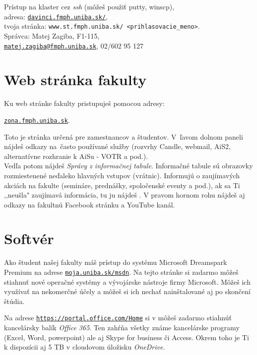 \medskip\noindent
Prístup na klaster cez \emph{ssh} (môžeš použiť putty, winscp),\\
adresa: \href{http://davinci.fmph.uniba.sk/}{\texttt{davinci.fmph.uniba.sk/}},\\
tvoja stránka: \texttt{www.st.fmph.uniba.sk/~<prihlasovacie\_meno>}.\\
Správca: Matej Zagiba, F1-115,\\
\href{mailto:matej.zagiba@fmph.uniba.sk}{\texttt{matej.zagiba@fmph.uniba.sk}}, 02/602 95 127

\section{Web stránka fakulty}

Ku web stránke fakulty pristupuješ pomocou adresy:

\begin{center}
	\vspace{-0.12cm}
\href{https://zona.fmph.uniba.sk}{\texttt{zona.fmph.uniba.sk}}.
	\vspace{-0.12cm}
\end{center}

\noindent
Toto je stránka určená pre zamestnancov a študentov. V~ľavom dolnom paneli nájdeš odkazy na~často používané služby (rozvrhy Candle, webmail, AiS2, alternatívne rozhranie k AiSu - VOTR a pod.). \\

Vedľa potom nájdeš \emph{Správy z informačnej tabule}. Informačné tabule sú obrazovky rozmiestenené neďaleko hlavných vstupov (vrátnic). Informujú o zaujímavých akciách na fakulte (semináre, prednášky, spoločenské eventy a pod.), ak sa Ti ,,neušla" zaujímavá informácia, tu ju nájdeš \Smiley. V pravom hornom rohu nájdeš aj odkazy na fakultnú Facebook stránku a YouTube kanál. 

\section{Softvér} \label{sec:7.6}

Ako študent našej fakulty máš prístup do systému Microsoft Dreamspark
Premium na adrese
\href{https://moja.uniba.sk/msdn}{\texttt{moja.uniba.sk/msdn}}. Na tejto stránke
si zadarmo môžeš stiahnuť nové operačné systémy a vývojárske nástroje
firmy Microsoft. Môžeš ich využívať na nekomerčné účely a môžeš si ich
nechať nainštalované aj po skončení štúdia.

Na adrese \href{https://portal.office.com/Home}{\texttt{https://portal.office.com/Home}} si v môžeš zadarmo stiahnúť kancelársky balík \emph{Office 365}. Ten zahŕňa všetky známe kancelárske programy (Excel, Word, powerpoint) ale aj Skype for business či Access. Okrem toho je Ti k dispozícii aj 5 TB v cloudovom úložisku \emph{OneDrive}.

